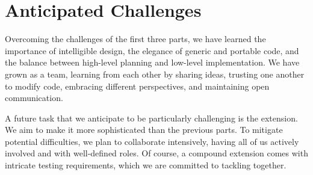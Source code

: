 \documentclass{article}
\begin{document}
\section{Anticipated Challenges}

Overcoming the challenges of the first three parts, we have learned the importance of intelligible design, the elegance of generic and portable code, and the balance between high-level planning and low-level implementation. We have grown as a team, learning from each other by sharing ideas, trusting one another to modify code, embracing different perspectives, and maintaining open communication.

A future task that we anticipate to be particularly challenging is the extension. We aim to make it more sophisticated than the previous parts. To mitigate potential difficulties, we plan to collaborate intensively, having all of us actively involved and with well-defined roles. Of course, a compound extension comes with intricate testing requirements, which we are committed to tackling together.
\end{document}
